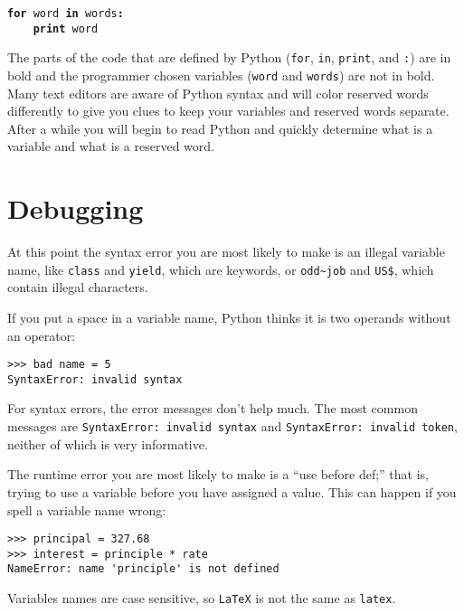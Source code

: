 \begin{ex}
{\tt {\bf for} word {\bf in} words{\bf :}\\
\verb"    "{\bf print} word }

The parts of the code that are defined by 
Python ({\tt for}, {\tt in}, {\tt print}, and {\tt :}) are in bold
and the programmer chosen variables ({\tt word} and {\tt words}) are not in bold.  
Many text editors are aware of Python
syntax and will color reserved words differently to give you clues to keep 
your variables and reserved words separate.
After a while you will begin to read Python and quickly determine what
is a variable and what is a reserved word.

\section{Debugging}

At this point the syntax error you are most likely to make is
an illegal variable name, like {\tt class} and {\tt yield}, which
are keywords, or \verb"odd~job" and \verb"US$", which contain
illegal characters.


If you put a space in a variable name, Python thinks it is two
operands without an operator:

\beforeverb
\begin{verbatim}
>>> bad name = 5
SyntaxError: invalid syntax
\end{verbatim}
\afterverb
%
For syntax errors, the error messages don't help much.
The most common messages are {\tt SyntaxError: invalid syntax} and
{\tt SyntaxError: invalid token}, neither of which is very informative.


The runtime error you are most likely to make is a ``use before
def;'' that is, trying to use a variable before you have assigned
a value.  This can happen if you spell a variable name wrong:

\beforeverb
\begin{verbatim}
>>> principal = 327.68
>>> interest = principle * rate
NameError: name 'principle' is not defined
\end{verbatim}
\afterverb
%
Variables names are case sensitive, so {\tt LaTeX} is not the
same as {\tt latex}.



\end{ex}
